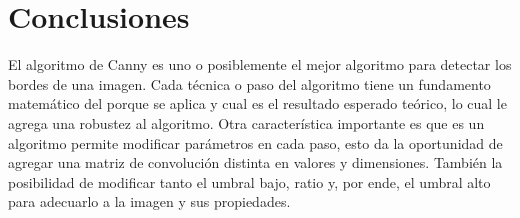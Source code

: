 \documentclass[conference]{IEEEtran}
\begin{document}
\section{Conclusiones}
El algoritmo de Canny es uno o posiblemente el mejor algoritmo para detectar los bordes de una imagen. Cada t\'ecnica o paso del algoritmo tiene un fundamento matem\'atico del porque se aplica y cual es el resultado esperado te\'orico, lo cual le agrega una robustez al algoritmo. Otra caracter\'istica importante es que es un algoritmo permite modificar par\'ametros en cada paso, esto da la oportunidad de agregar una matriz de convoluci\'on distinta en valores y dimensiones. Tambi\'en la posibilidad de modificar tanto el umbral bajo, ratio y, por ende, el umbral alto para adecuarlo a la imagen y sus propiedades.


\end{document}
